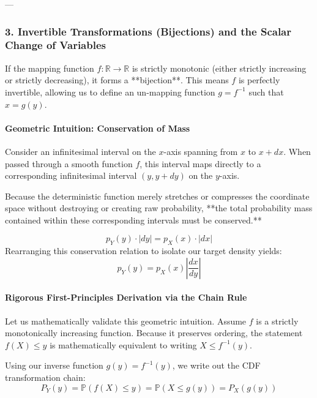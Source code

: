 \documentclass{article}
\begin{document}
---

\subsubsection*{3. Invertible Transformations (Bijections) and the Scalar Change of Variables}

If the mapping function $f: \mathbb{R} \to \mathbb{R}$ is strictly monotonic (either strictly increasing or strictly decreasing), it forms a **bijection**. This means $f$ is perfectly invertible, allowing us to define an un-mapping function $g = f^{-1}$ such that $x = g(y)$.

\paragraph{Geometric Intuition: Conservation of Mass}
Consider an infinitesimal interval on the $x$-axis spanning from $x$ to $x + dx$. When passed through a smooth function $f$, this interval maps directly to a corresponding infinitesimal interval $(y, y + dy)$ on the $y$-axis. 

Because the deterministic function merely stretches or compresses the coordinate space without destroying or creating raw probability, **the total probability mass contained within these corresponding intervals must be conserved.**

\begin{equation}
p_Y(y) \cdot |dy| = p_X(x) \cdot |dx| \tag{213}
\end{equation}
Rearranging this conservation relation to isolate our target density yields:
\begin{equation*}
p_Y(y) = p_X(x) \left| \frac{dx}{dy} \right|
\end{equation*}

\paragraph{Rigorous First-Principles Derivation via the Chain Rule}
Let us mathematically validate this geometric intuition. Assume $f$ is a strictly monotonically increasing function. Because it preserves ordering, the statement $f(X) \le y$ is mathematically equivalent to writing $X \le f^{-1}(y)$. 

Using our inverse function $g(y) = f^{-1}(y)$, we write out the CDF transformation chain:
\begin{equation}
P_Y(y) = \mathbb{P}(f(X) \le y) = \mathbb{P}(X \le g(y)) = P_X(g(y)) \tag{214}
\end{equation}
\end{document}
